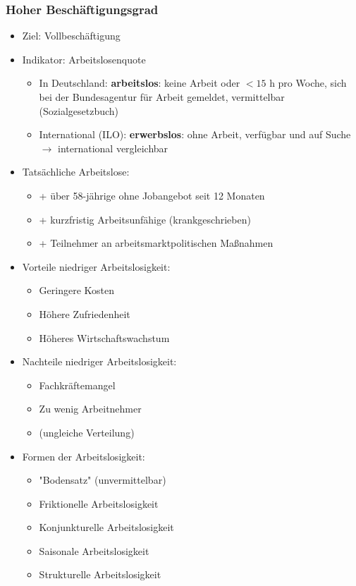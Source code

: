 \documentclass[titlepage,parskip=half]{scrartcl}
\begin{document}
\subsubsection{Hoher Beschäftigungsgrad}
\begin{itemize}
    \item Ziel: Vollbeschäftigung
    \item Indikator: Arbeitslosenquote
    \begin{itemize}
        \item In Deutschland: \textbf{arbeitslos}: keine Arbeit oder $<15$ h pro Woche, sich bei der Bundesagentur für Arbeit gemeldet, vermittelbar (Sozialgesetzbuch)
        \item International (ILO): \textbf{erwerbslos}: ohne Arbeit, verfügbar und auf Suche $\rightarrow$ international vergleichbar
    \end{itemize}
    \item Tatsächliche Arbeitslose:
    \begin{itemize}
        \item + über 58-jährige ohne Jobangebot seit 12 Monaten
        \item + kurzfristig Arbeitsunfähige (krankgeschrieben)
        \item + Teilnehmer an arbeitsmarktpolitischen Maßnahmen
    \end{itemize}
    \item Vorteile niedriger Arbeitslosigkeit:
    \begin{itemize}
        \item Geringere Kosten
        \item Höhere Zufriedenheit
        \item Höheres Wirtschaftswachstum
    \end{itemize}
    \item Nachteile niedriger Arbeitslosigkeit:
    \begin{itemize}
        \item Fachkräftemangel
        \item Zu wenig Arbeitnehmer
        \item (ungleiche Verteilung)
    \end{itemize}
    \item Formen der Arbeitslosigkeit:
    \begin{itemize}
        \item "Bodensatz" (unvermittelbar)
        \item Friktionelle Arbeitslosigkeit
        \item Konjunkturelle Arbeitslosigkeit
        \item Saisonale Arbeitslosigkeit
        \item Strukturelle Arbeitslosigkeit
    \end{itemize}
\end{itemize}
\end{document}
